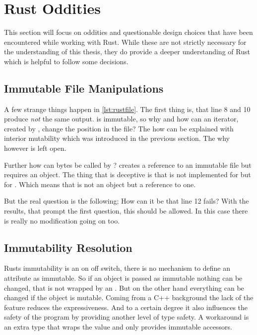\documentclass[thesis]{subfiles}
\begin{document}
\section{Rust Oddities}
  This section will focus on oddities and questionable design choices that have been encountered while working with Rust.
  While these are not strictly necessary for the understanding of this thesis, they do provide a deeper understanding of Rust which is helpful to follow some decisions.

  \subsection{Immutable File Manipulations}
    A few strange things happen in \autoref{lst:rustfile}.
    The first thing is, that line 8 and 10 produce \emph{not} the same output.
     is immutable, so why and how can an iterator, created by , change the position in the file?
    The how can be explained with interior mutability which was introduced in the previous section.
    The why however is left open.

    Further how can bytes be called by ?
     creates a reference to an immutable file but  requires an object.
    The thing that is deceptive is that \trait \Read is not implemented for \File but for .
    Which means that \self is not an object but a reference to one.

    But the real question is the following; How can it be that line 12 fails?
    With the results, that prompt the first question, this should be allowed.
    In this case there is really no modification going on too.


  \subsection{Immutability Resolution}
    Rusts immutability is an on off switch, there is no mechanism to define an attribute as immutable.
    So if an object is passed as immutable nothing can be changed, that is not wrapped by an \UnsafeCellT.
    But on the other hand everything can be changed if the object is mutable.
    Coming from a C++ background the lack of the  feature reduces the expressiveness.
    And to a certain degree it also influences the safety of the program by providing another level of type safety\autocite[30ff.]{cpp101}.
    A workaround is an extra type that wraps the value and only provides immutable accessors.
\end{document}
